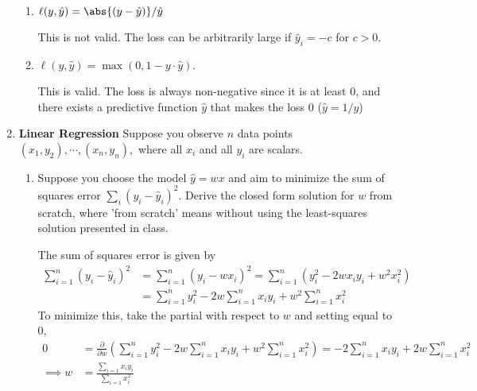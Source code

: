 \documentclass{article}
\begin{document}
\begin{enumerate}[1)]
\begin{enumerate}[1.]
			\item $\ell(y, \hat y)=\abs{(y-\hat y)}/\hat y$
				\begin{answer*}
					This is not valid. The loss can be arbitrarily large if $\hat y_i=-c$ for $c>0.$
				\end{answer*}
				
			\item $\ell(y, \hat y)=\max(0, 1-y\cdot \hat y).$
				\begin{answer*}
					This is valid. The loss is always non-negative since it is at least 0, and there exists a predictive function $\hat y$ that makes the loss 0 ($\hat y=1/y$)
				\end{answer*}
				
		\end{enumerate}

		\newpage
	\item \textbf{Linear Regression} Suppose you observe $n$ data points $(x_1, y_2), \cdots, (x_n, y_n),$ where all $x_i$ and all $y_i$ are scalars. 
		\begin{enumerate}[1.]
			\item Suppose you choose the model $\hat y=wx$ and aim to minimize the sum of squares error $\sum_{i}^{}(y_i-\hat y_i)^2.$ Derive the closed form solution for $w$ from scratch, where 'from scratch' means without using the least-squares solution presented in class.
				\begin{soln}
					The sum of squares error is given by
					\begin{align*}
						\sum_{i=1}^{n} (y_i-\hat y_i)^2 &= \sum_{i=1}^{n} (y_i- wx_i)^2 = \sum_{i=1}^{n}(y_i^2-2wx_iy_i+w^2x_i^2) \\
						&= \sum_{i=1}^{n} y_i^2 - 2w\sum_{i=1}^{n} x_iy_i + w^2\sum_{i=1}^{n} x_i^2
					\end{align*}
					To minimize this, take the partial with respect to $w$ and setting equal to 0,
					\begin{align*}
						0&=\frac{\partial}{\partial w} \left( \sum_{i=1}^{n} y_i^2 - 2w\sum_{i=1}^{n} x_iy_i + w^2\sum_{i=1}^{n} x_i^2 \right) = -2\sum_{i=1}^{n} x_iy_i + 2w\sum_{i=1}^{n} x_i^2 \\
						\implies w &= \frac{\sum_{i=1}^{}x_iy_i}{\sum_{i=1}^{} x_i^2}
					\end{align*}
				\end{soln}


\end{enumerate}
\end{enumerate}
\end{document}
